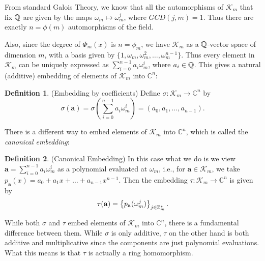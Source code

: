 \documentclass[12pt]{article}
\theoremstyle{plain}
\theoremstyle{definition}
\newtheorem{definition}{Definition}
\theoremstyle{remark}
\begin{document}
From standard Galois Theory, we know that all the automorphisms of $\mathcal{K}_m$ that fix $\mathbb{Q}$ are given by the maps $\omega_m \mapsto \omega_m^j$, where $GCD(j,m)=1$. Thus there are exactly $n=\phi(m)$ automorphisms of the field. 

Also, since the degree of $\Phi_m(x)$ is $n=\phi_m$, we have $\mathcal{K}_m$ as a $\mathbb{Q}$-vector space of dimension $m$, with a basis given by $\{1, \omega_m, \omega_m^2, \dots, \omega_m^{n-1}\}$. Thus every element in $\mathcal{K}_m$ can be uniquely expressed as $\sum_{i=0}^{n-1}a_i\omega_m^i$, where $a_i \in \mathbb{Q}$. This gives a natural (additive) embedding of elements of $\mathcal{K}_m$ into $\mathbb{C}^n$:

\begin{definition}(Embedding by coefficients)
Define $\sigma:\mathcal{K}_m \rightarrow \mathbb{C}^n$ by 
$$\sigma(\mathbf{a}) = \sigma \left (\sum_{i=0}^{n-1}a_i\omega_m^i\right ) = (a_0, a_1, \dots, a_{n-1}).$$
\end{definition}

There is a different way to embed elements of $\mathcal{K}_m$ into $\mathbb{C}^n$, which is called the {\it canonical embedding}:
\begin{definition} (Canonical Embedding)
In this case what we do is we view $\mathbf{a} = \sum_{i=0}^{n-1}a_i\omega_m^i$ as a polynomial evaluated at $\omega_m$, i.e., for $\mathbf{a} \in \mathcal{K}_m$, we take
$p_{\mathbf{a}}(x) =a_0+a_1x+\dots +a_{n-1}x^{n-1}$. Then the embedding $\tau:\mathcal{K}_m \rightarrow \mathbb{C}^n$ is given by 
$$\tau(\mathbf{a}) = \left \{p_{\mathbf{a}}(\omega_m^j)\right\}_{j\in \mathbb{Z}_m^*}.$$
\end{definition}

While both $\sigma$ and $\tau$ embed elements of $\mathcal{K}_m$ into $\mathbb{C}^n$, there is a fundamental difference between them. 
While $\sigma$ is only additive, $\tau$ on the other hand is both additive and multiplicative since the components are just polynomial evaluations. What this means is that $\tau$ is actually a ring homomorphism.
\end{document}
